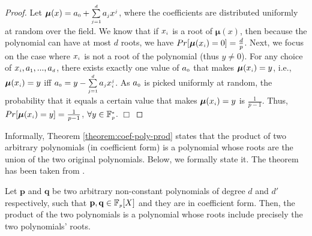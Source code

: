 \begin{proof} Let $\bm\mu(x)=a_{\scriptscriptstyle 0}+\sum\limits^{\scriptscriptstyle d}_{\scriptscriptstyle j=1} a_{\scriptscriptstyle j}x^{\scriptscriptstyle j}$, where the  coefficients  are distributed uniformly at random over the field. We know that if $x_{\scriptscriptstyle i}$ is a root of  $\bm\mu(x)$, then because the polynomial can have at most $d$ roots, we have $Pr[\bm\mu(x_{\scriptscriptstyle i})=0]=\frac{d}{p}$. Next, we focus on the case where $x_{\scriptscriptstyle i}$ is not a root of the polynomial (thus $y\neq 0$). For any choice of $x_{\scriptscriptstyle i},   a_{\scriptscriptstyle 1},...,a_{\scriptscriptstyle d}$, there exists exactly   one value of $a_{\scriptscriptstyle 0}$ that makes $\bm\mu(x_{\scriptscriptstyle i})=y$, i.e., $\bm\mu(x_{\scriptscriptstyle i})=y$ iff $a_{\scriptscriptstyle 0}=y- \sum\limits^{\scriptscriptstyle d}_{\scriptscriptstyle j=1} a_{\scriptscriptstyle j}x_{\scriptscriptstyle i}^{\scriptscriptstyle j}$. As $a_{\scriptscriptstyle 0}$ is picked uniformly at random, the probability that it equals a certain value that makes $\bm\mu(x_{\scriptscriptstyle i})=y$ is  $\frac{1}{p-1}$. Thus, $Pr[\bm\mu(x_{\scriptscriptstyle i})=y]=\frac{1}{p-1}$, $\forall y\in \mathbb{F}^{\scriptscriptstyle *}_{\scriptscriptstyle p}$. 
%
\hfill\(\Box\)
\end{proof} 



Informally, Theorem \ref{theorem:coef-poly-prod} states that the product of two arbitrary polynomials (in coefficient form) is a polynomial whose roots are the union of the two original polynomials.  Below, we formally state it. The theorem has been taken from \cite{AbadiMZ21}. 


\begin{theorem}\label{theorem:coef-poly-prod}
Let $\mathbf{p}$ and   $\mathbf{q}$ be two arbitrary non-constant polynomials of degree $d$ and $d'$ respectively, such that  $\mathbf{p} , \mathbf{q}   \in \mathbb{F}_{\scriptscriptstyle p}[X]$ and they are in coefficient form. Then, the product of the two polynomials is a polynomial whose roots include precisely the two polynomials' roots. 
\end{theorem}


